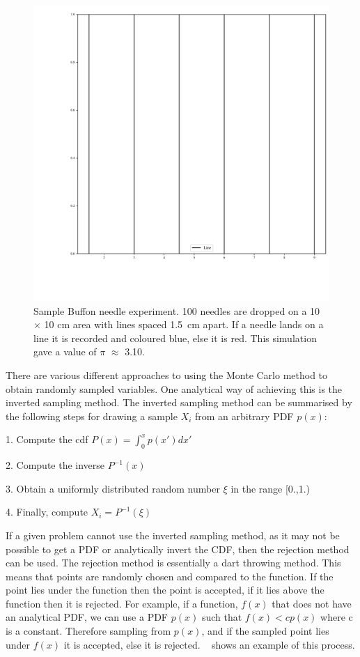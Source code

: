 \begin{figure}[!htbp]
\centering
\includegraphics[width=.6\textwidth]{buffon.pdf}
\caption{Sample Buffon needle experiment. 100 needles are dropped on a 10 $\times$ 10 cm area with lines spaced 1.5~cm apart. If a needle lands on a line it is recorded and coloured blue, else it is red. This simulation gave a value of $\pi$ $\approx$ 3.10.}
\label{fig:buffon-needle}
\vspace{-20pt}
\end{figure}

There are various different approaches to using the Monte Carlo method to obtain randomly sampled variables.
One analytical way of achieving this is the inverted sampling method.
The inverted sampling method can be summarised by the following steps for drawing a sample $X_i$ from an arbitrary PDF $p(x)$:

\medskip

1. Compute the \gls*{cdf} $P(x)=\int^{x}_{0}p(x')dx'$

2. Compute the inverse $P^{-1}(x)$

3. Obtain a uniformly distributed random number $\xi$ in the range [0.,1.)

4. Finally, compute $X_i = P^{-1}(\xi)$

\medskip

If a given problem cannot use the inverted sampling method, as it may not be possible to get a PDF or analytically invert the CDF, then the rejection method can be used.
The rejection method is essentially a dart throwing method.
This means that points are randomly chosen and compared to the function.
If the point lies under the function then the point is accepted, if it lies above the function then it is rejected.
For example, if a function, $f(x)$ that does not have an analytical PDF, we can use a PDF $p(x)$ such that $f(x) < cp(x)$ where c is a constant.
Therefore sampling from $p(x)$, and if the sampled point lies under $f(x)$ it is accepted, else it is rejected.
~ shows an example of this process.

